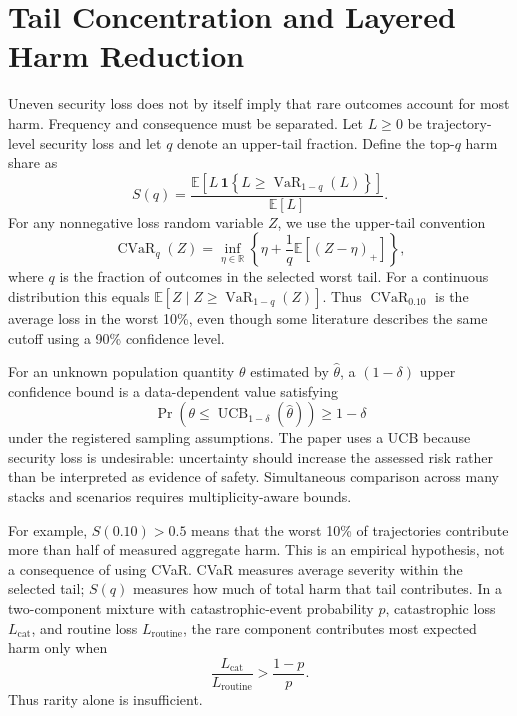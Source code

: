 \documentclass[10pt]{article}
\newcommand{\cvar}{\operatorname{CVaR}}
\newcommand{\ucb}{\operatorname{UCB}}
\begin{document}
\section{Tail Concentration and Layered Harm Reduction}
Uneven security loss does not by itself imply that rare outcomes account for most harm. Frequency and consequence must be separated. Let $L\geq 0$ be trajectory-level security loss and let $q$ denote an upper-tail fraction. Define the top-$q$ harm share as
\begin{equation}
S(q)=
\frac{\mathbb{E}\!\left[L\,\mathbf{1}\!\left\{L\geq \operatorname{VaR}_{1-q}(L)\right\}\right]}
{\mathbb{E}[L]}.
\label{eq:tailshare}
\end{equation}
For any nonnegative loss random variable $Z$, we use the upper-tail convention
\begin{equation}
\cvar_q(Z)=\inf_{\eta\in\mathbb{R}}
\left\{\eta+\frac{1}{q}\mathbb{E}\left[(Z-\eta)_+\right]\right\},
\label{eq:cvar-definition}
\end{equation}
where $q$ is the fraction of outcomes in the selected worst tail. For a continuous distribution this equals $\mathbb{E}[Z\mid Z\geq\operatorname{VaR}_{1-q}(Z)]$. Thus $\cvar_{0.10}$ is the average loss in the worst 10\%, even though some literature describes the same cutoff using a 90\% confidence level.

For an unknown population quantity $\theta$ estimated by $\widehat\theta$, a $(1-\delta)$ upper confidence bound is a data-dependent value satisfying
\begin{equation}
\Pr\!\left(\theta\leq \ucb_{1-\delta}(\widehat\theta)\right)\geq 1-\delta
\label{eq:ucb-definition}
\end{equation}
under the registered sampling assumptions. The paper uses a UCB because security loss is undesirable: uncertainty should increase the assessed risk rather than be interpreted as evidence of safety. Simultaneous comparison across many stacks and scenarios requires multiplicity-aware bounds.

For example, $S(0.10)>0.5$ means that the worst 10\% of trajectories contribute more than half of measured aggregate harm. This is an empirical hypothesis, not a consequence of using CVaR. CVaR measures average severity within the selected tail; $S(q)$ measures how much of total harm that tail contributes. In a two-component mixture with catastrophic-event probability $p$, catastrophic loss $L_{\mathrm{cat}}$, and routine loss $L_{\mathrm{routine}}$, the rare component contributes most expected harm only when
\[
\frac{L_{\mathrm{cat}}}{L_{\mathrm{routine}}}>\frac{1-p}{p}.
\]
Thus rarity alone is insufficient.
\end{document}
